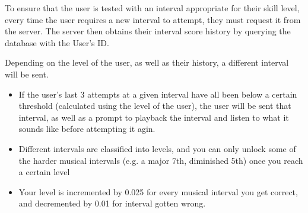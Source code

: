 To ensure that the user is tested with an interval appropriate for their skill level, every time the user requires a new interval to attempt, they must request it from the server. The server then obtains their interval score history by querying the database with the User's ID. 

Depending on the level of the user, as well as their history, a different interval will be sent.
\begin{itemize}
	\item If the user's last 3 attempts at a given interval have all been below a certain threshold (calculated using the level of the user), the user will be sent that interval, as well as a prompt to playback the interval and listen to what it sounds like before attempting it agin.
	\item Different intervals are classified into levels, and you can only unlock some of the harder musical intervals (e.g. a major 7th, diminished 5th) once you reach a certain level
	\item Your level is incremented by 0.025 for every musical interval you get correct, and decremented by 0.01 for interval gotten wrong.
\end{itemize}